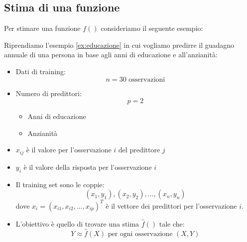 \documentclass[a4paper]{article}
\begin{document}
\subsection{Stima di una funzione}
Per stimare una funzione \( f() \) consideriamo il seguente esempio:
\begin{example}
  Riprendiamo l'esempio \ref{ex:educazione} in cui vogliamo predirre il guadagno
  annuale di una persona in base agli anni di educazione e all'anzianità:
  \begin{itemize}
    \item Dati di training:
      \[
        n = 30 \text{ osservazioni}
      \] 
    \item Numero di predittori:
      \[
        p = 2
      \]
      \begin{itemize}
        \item Anni di educazione
        \item Anzianità
      \end{itemize}

    \item \( x_{ij} \) è il valore per l'osservazione \( i \) del predittore \( j \)

    \item \( y_i \) è il valore della risposta per l'osservazione \( i \)

    \item Il training set sono le coppie:
      \[
        (x_1, y_1), (x_2, y_2), \ldots, (x_n, y_n)
      \] 
      dove \( x_i = (x_{i1}, x_{i2}, \ldots, x_{ip})^T \) è il vettore dei predittori
      per l'osservazione \( i \).

    \item L'obiettivo è quello di trovare una stima \( \hat{f}() \) tale che:
      \[
        Y \approx \hat{f}(X) \text{ per ogni osservazione } (X, Y)
      \] 
  \end{itemize}
\end{example}
\end{document}
